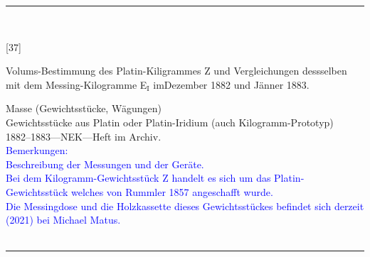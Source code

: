 \parbox{\textwidth}{%
\rule{\textwidth}{1pt}\vspace*{-3mm}\\
\begin{minipage}[t]{0.15\textwidth}\vspace{0pt}
\Huge\rule[-4mm]{0cm}{1cm}[37]
\end{minipage}
\hfill
\begin{minipage}[t]{0.85\textwidth}\vspace{0pt}
\large Volums-Bestimmung des Platin-Kiligrammes {\glqq}Z{\grqq} und Vergleichungen dessselben mit dem Messing-Kilogramme {\glqq}E$_\mathrm{I}${\grqq} imDezember 1882 und Jänner 1883.\rule[-2mm]{0mm}{2mm}
\end{minipage}
{\footnotesize\flushright
Masse (Gewichtsstücke, Wägungen)\\
Gewichtsstücke aus Platin oder Platin-Iridium (auch Kilogramm-Prototyp)\\
}
1882--1883\quad---\quad NEK\quad---\quad Heft im Archiv.\\
\textcolor{blue}{Bemerkungen:\\{}
Beschreibung der Messungen und der Geräte.\\{}
Bei dem Kilogramm-Gewichtsstück {\glqq}Z{\grqq} handelt es sich um das Platin-Gewichtsstück welches von Rummler 1857 angeschafft wurde.\\{}
Die Messingdose und die Holzkassette dieses Gewichtsstückes befindet sich derzeit (2021) bei Michael Matus.\\{}
}
\\[-15pt]
\rule{\textwidth}{1pt}
}
\\
\vspace*{-2.5pt}\\
